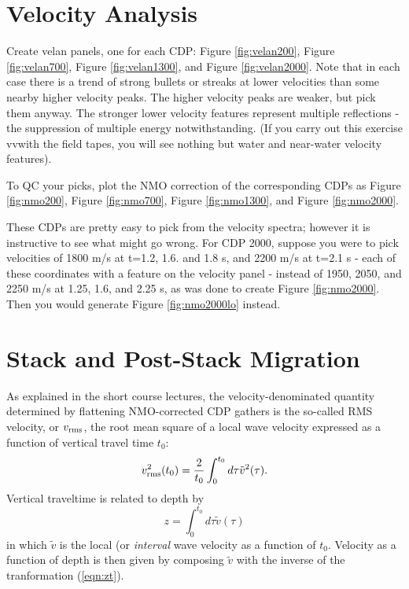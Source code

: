 \section{Velocity Analysis}
Create velan panels, one for each CDP: Figure \ref{fig:velan200}, Figure \ref{fig:velan700}, Figure \ref{fig:velan1300}, and Figure \ref{fig:velan2000}. Note that in each case there is a trend of strong bullets or streaks at lower velocities than some nearby higher velocity peaks. The higher velocity peaks are weaker, but pick them anyway. The stronger lower velocity features represent multiple reflections - the suppression of multiple energy notwithstanding. (If you carry out this exercise vvwith the field tapes, you will see nothing but water and near-water velocity features).

To QC your picks, plot the NMO correction of the corresponding CDPs as Figure \ref{fig:nmo200}, Figure \ref{fig:nmo700}, Figure \ref{fig:nmo1300}, and Figure \ref{fig:nmo2000}.

These CDPs are pretty easy to pick from the velocity spectra; however it is instructive to see what might go wrong. For CDP 2000, suppose you were to pick velocities of 1800 m/s at t=1.2, 1.6. and 1.8  s, and 2200 m/s at t=2.1 s - each of these coordinates with a feature on the velocity panel - instead of 1950, 2050, and 2250 m/s at 1.25, 1.6, and 2.25 s, as was done to create Figure \ref{fig:nmo2000}. Then you would generate Figure \ref{fig:nmo2000lo} instead. 

\section{Stack and Post-Stack Migration}

As explained in the short course lectures, the velocity-denominated quantity determined by flattening NMO-corrected CDP gathers is the so-called RMS velocity, or $v_{\rm rms}$, the root mean square of a local wave velocity expressed as a function of vertical travel time $t_0$:
\begin{equation}
\label{eqn:vrms}
v_{\rm rms}^2(t_0)= \frac{2}{t_0}\int_0^{t_0} d\tau \tilde{v}^2(\tau).
\end{equation}
Vertical traveltime is related to depth by 
\begin{equation}
\label{eqn:zt}
z=\int_0^{t_0}d\tau\tilde{v}(\tau)
\end{equation}
in which $\tilde{v}$ is the local (or {\em interval} wave velocity as a function of $t_0$. Velocity as a function of depth is then given by composing $\tilde{v}$ with the inverse of the tranformation (\ref{eqn:zt}). 

